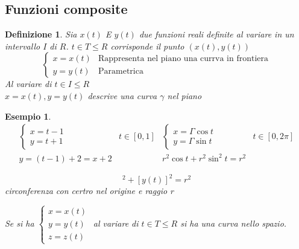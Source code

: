 \documentclass{book}
\newtheorem{defi}{Definizione}
\newtheorem{esempio}{Esempio}
\begin{document}
\subsection{Funzioni composite}
\begin{defi}
  Sia $x(t)$ E $y(t)$ due funzioni reali definite al variare in un intervallo $I$ di $R$.
  $t\in T \leq R$ corrisponde il punto $(x(t),y(t))$
  \begin{equation*}
    \begin{cases}
      x=x(t) & \text{Rappresenta nel piano una currva in frontiera}\\
      y=y(t) & \text{Parametrica}
    \end{cases}
  \end{equation*}
  Al variare di $t\in I\leq R$\\
  $x=x(t),y=y(t)$ descrive una curva $\gamma$ nel piano 
\end{defi}
\clearpage
\begin{esempio}
  \begin{equation*}
    \begin{matrix}
    \begin{cases}
        x=t-1\\
        y=t+1
    \end{cases}& t\in [0,1] &
    \begin{cases}
        x=\Gamma \cos t\\
        y=\Gamma \sin t
    \end{cases}& t\in [0,2\pi]\\
      y=(t-1)+2=x+2 && r^2\cos t+ r^2\sin^2t=r^2
    \end{matrix}
  \end{equation*}
  \begin{multicols}{2}
      \begin{equation*}
      	[x(t)]^2+[y(t)]^2=r^2
      \end{equation*}
      circonferenza con certro nel origine e raggio r
    \end{multicols}
    Se si ha $\begin{cases} x=x(t) \\ y=y(t) \\ z=z(t)\end{cases}$ al variare di $t\in T \leq R$ si
    ha una curva nello spazio.
\end{esempio}
\end{document}
